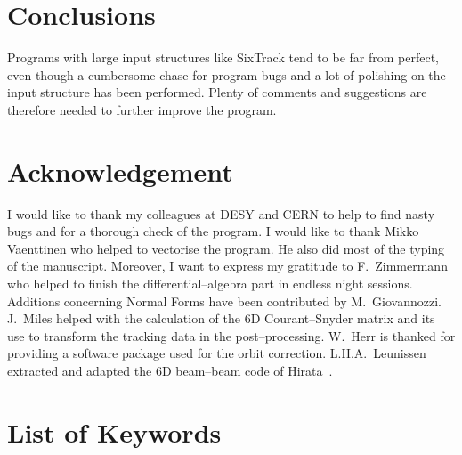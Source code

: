 \documentclass[a4paper,11pt]{report}
\begin{document}
\chapter*{Conclusions}

Programs with large input structures like SixTrack tend to be far from
perfect, even though a cumbersome chase for program bugs and a lot of
polishing on the input structure has been performed.  Plenty of
comments and suggestions are therefore needed to further improve the
program.

\chapter{Acknowledgement}

I would like to thank my colleagues at DESY and CERN to help to find
nasty bugs and for a thorough check of the program. I would like to
thank Mikko Vaenttinen who helped to vectorise the program. He also
did most of the typing of the manuscript. Moreover, I want to express
my gratitude to F.~Zimmermann who helped to finish the
differential--algebra part in endless night sessions. Additions
concerning Normal Forms have been contributed by M.~Giovannozzi.
J.~Miles helped with the calculation of the 6D Courant--Snyder matrix
and its use to transform the tracking data in the post--processing.
W.~Herr is thanked for providing a software package used for the orbit
correction. L.H.A.~Leunissen extracted and adapted the 6D beam--beam
code of Hirata~\cite{Hirata}.

\appendix


\chapter{List of Keywords} \label{Lkey}

 \setcounter{kwc}{0}
\end{document}
